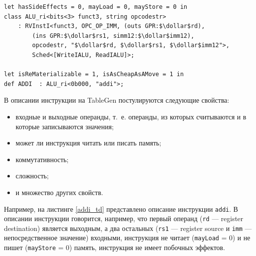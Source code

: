\begin{lstlisting}[caption={Описание инструкции addi при помощи TableGen}, language=tblgen, frame=single, mathescape=true, label=addi_td]
let hasSideEffects = 0, mayLoad = 0, mayStore = 0 in
class ALU_ri<bits<3> funct3, string opcodestr>
    : RVInstI<funct3, OPC_OP_IMM, (outs GPR:$\dollar$rd),
        (ins GPR:$\dollar$rs1, simm12:$\dollar$imm12),
        opcodestr, "$\dollar$rd, $\dollar$rs1, $\dollar$imm12">,
        Sched<[WriteIALU, ReadIALU]>;

let isReMaterializable = 1, isAsCheapAsAMove = 1 in
def ADDI  : ALU_ri<0b000, "addi">;
\end{lstlisting}

В описании инструкции на TableGen постулируются следующие свойства:
\begin{itemize}
  \item входные и выходные операнды, т.~е. операнды, из которых считываются и в которые записываются значения;
  \item может ли инструкция читать или писать память;
  \item коммутативность;
  \item сложность;
  \item и множество других свойств.
\end{itemize}

Например, на листинге \ref{addi_td} представлено описание инструкции \texttt{addi}. В описании инструкции говорится, например, что первый операнд (\texttt{rd} --- register destination) является выходным, а два остальных (\texttt{rs1} --- register source и \texttt{imm} --- непосредственное значение) входными, инструкция не читает (\texttt{mayLoad} = 0) и не пишет (\texttt{mayStore} = 0) память, инструкция не имеет побочных эффектов.




